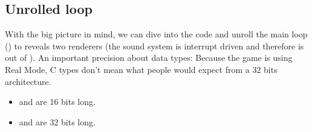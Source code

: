 \documentclass[book.tex]{subfiles}
\begin{document}
\subsection{Unrolled loop}
With the big picture in mind, we can dive into the code and unroll the main loop () to reveals two renderers (the sound system is interrupt driven and therefore is out of ). An important precision about data types: Because the game is using Real Mode, C types don't mean what people would expect from a 32 bits architecture.\\
\begin{itemize}
\item {} and  are 16 bits long.
\item {} and  are 32 bits long.
\end{itemize}

\par
\begin{minipage}{\textwidth}

\end{minipage}
\par
\end{document}
